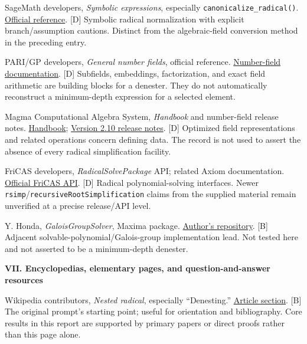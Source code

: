 \documentclass[11pt,a4paper]{article}
\numberwithin{equation}{section}
\theoremstyle{definition}\newtheorem{definition}[theorem]{Definition}
\theoremstyle{remark}\newtheorem{remark}[theorem]{Remark}
\newcommand{\access}[2]{\href{#1}{#2}}
\newcommand{\status}[1]{\textsf{\footnotesize[#1]}}
\newcommand{\bibgroup}[1]{\par\Needspace{7\baselineskip}\bigskip\item[]\textbf{#1}\par\smallskip}
\begin{document}
\begin{thebibliography}{99}
 SageMath developers, \emph{Symbolic expressions}, especially \texttt{canonicalize\_radical()}.
\access{https://doc.sagemath.org/html/en/reference/calculus/sage/symbolic/expression.html}{Official reference}. \status{D}
Symbolic radical normalization with explicit branch/assumption cautions. Distinct from the algebraic-field conversion method in the preceding entry.

 PARI/GP developers, \emph{General number fields}, official reference.
\access{https://pari.math.u-bordeaux.fr/dochtml/html-stable/General_number_fields.html}{Number-field documentation}. \status{D}
Subfields, embeddings, factorization, and exact field arithmetic are building blocks for a denester. They do not automatically reconstruct a minimum-depth expression for a selected element.

 Magma Computational Algebra System, \emph{Handbook} and number-field release notes.
\access{https://magma.maths.usyd.edu.au/magma/handbook/}{Handbook};
\access{https://magma.maths.usyd.edu.au/magma/releasenotes/pdf/relv210.pdf}{Version 2.10 release notes}. \status{D}
Optimized field representations and related operations concern defining data. The record is not used to assert the absence of every radical simplification facility.

 FriCAS developers, \emph{RadicalSolvePackage} API; related Axiom documentation.
\access{https://fricas.github.io/api/RadicalSolvePackage.html}{Official FriCAS API}. \status{D}
Radical polynomial-solving interfaces. Newer \texttt{rsimp}/\texttt{recursiveRootSimplification} claims from the supplied material remain unverified at a precise release/API level.

 Y. Honda, \emph{GaloisGroupSolver}, Maxima package.
\access{https://github.com/YasuakiHonda/GaloisGroupSolver}{Author's repository}. \status{B}
Adjacent solvable-polynomial/Galois-group implementation lead. Not tested here and not asserted to be a minimum-depth denester.

\bibgroup{VII. Encyclopedias, elementary pages, and question-and-answer resources}

 Wikipedia contributors, \emph{Nested radical}, especially ``Denesting.''
\access{https://en.wikipedia.org/wiki/Nested_radical\#Denesting}{Article section}. \status{B}
The original prompt's starting point; useful for orientation and bibliography. Core results in this report are supported by primary papers or direct proofs rather than this page alone.


\end{thebibliography}
\end{document}
